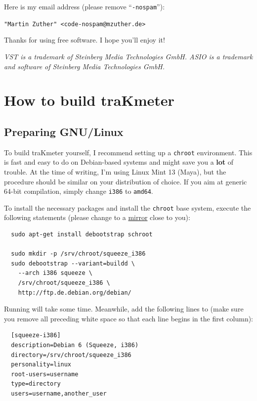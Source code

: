 Here is my email address (please remove ``\texttt{-nospam}''):

\begin{center}
  \texttt{"Martin Zuther" <code-nospam@mzuther.de>}
\end{center}

Thanks for using free software.  I hope you'll enjoy it!

\emph{VST is a trademark of Steinberg Media Technologies GmbH.  ASIO
  is a trademark and software of Steinberg Media Technologies GmbH.}

\appendix

\chapter{How to build traKmeter}
\label{chap:build_trakmeter}

\section{Preparing GNU/Linux}

To build traKmeter yourself, I recommend setting up a \texttt{chroot}
environment.  This is fast and easy to do on Debian-based systems and
might save you a \textbf{lot} of trouble.  At the time of writing, I'm
using Linux Mint 13 (Maya), but the procedure should be similar on
your distribution of choice.  If you aim at generic \num{64}-bit
compilation, simply change \texttt{i386} to \texttt{amd64}.

To install the necessary packages and install the \texttt{chroot} base
system, execute the following statements (please change
 to a
\href{http://www.debian.org/mirror/list}{mirror} close to you):

\begin{verbatim}
  sudo apt-get install debootstrap schroot

  sudo mkdir -p /srv/chroot/squeeze_i386
  sudo debootstrap --variant=buildd \
    --arch i386 squeeze \
    /srv/chroot/squeeze_i386 \
    http://ftp.de.debian.org/debian/
\end{verbatim}

Running  will take some time.  Meanwhile, add the
following lines to  (make sure you
remove all preceding white space so that each line begins in the first
column):

\begin{verbatim}
  [squeeze-i386]
  description=Debian 6 (Squeeze, i386)
  directory=/srv/chroot/squeeze_i386
  personality=linux
  root-users=username
  type=directory
  users=username,another_user
\end{verbatim}


